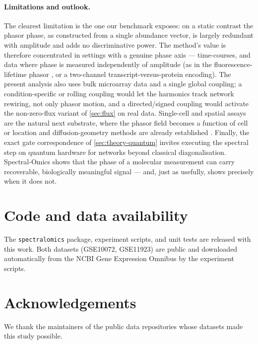 \documentclass[preprint,12pt,amsmath,amssymb,superscriptaddress,floatfix]{revtex4-2}
\theoremstyle{definition}
\theoremstyle{plain}
\begin{document}
\paragraph{Limitations and outlook.}
The clearest limitation is the one our benchmark exposes: on a static contrast the
phasor phase, as constructed from a single abundance vector, is largely redundant
with amplitude and adds no discriminative power. The method's value is therefore
concentrated in settings with a genuine phase axis --- time-courses, and data
where phase is measured independently of amplitude (as in the fluorescence-lifetime
phasor \citep{digman2008phasor}, or a two-channel transcript-versus-protein
encoding). The present analysis also uses bulk microarray data and a single global
coupling; a condition-specific or rolling coupling would let the harmonics track
network rewiring, not only phasor motion, and a directed/signed coupling would
activate the non-zero-flux variant of \cref{sec:flux} on real data. Single-cell and
spatial assays are the natural next substrate, where the phasor field becomes a
function of cell or location and diffusion-geometry methods are already established
\citep{haghverdi2015diffusion}. Finally, the exact gate correspondence of
\cref{sec:theory-quantum} invites executing the spectral step on quantum hardware
for networks beyond classical diagonalisation. Spectral-Omics shows that the phase
of a molecular measurement can carry recoverable, biologically meaningful signal
--- and, just as usefully, shows precisely when it does not.

\section*{Code and data availability}
The \texttt{spectralomics} package, experiment scripts, and unit tests are
released with this work. Both datasets (GSE10072, GSE11923) are public and
downloaded automatically from the NCBI Gene Expression Omnibus
\citep{edgar2002geo} by the experiment scripts.

\section*{Acknowledgements}
We thank the maintainers of the public data repositories whose datasets made
this study possible.



\end{document}
